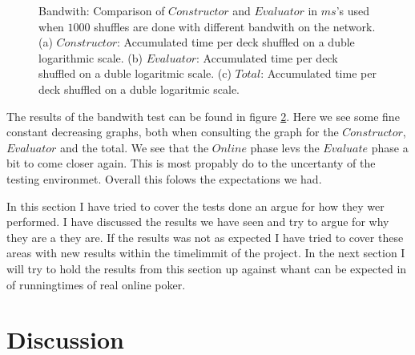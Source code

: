 \documentclass[twoside,11pt,openright]{report}
\begin{document}
\begin{figure}
    \begin{subfigure}{\textwidth}
        \centering
        \caption{}
        \label{fig:total_bandwith_plot}
    \end{subfigure}
    \caption{Bandwith: Comparison of $Constructor$ and $Evaluator$ in $ms$'s used when $1000$ shuffles are done with different bandwith on the network. (a) $Constructor$: Accumulated time per deck shuffled on a duble logarithmic scale. (b) $Evaluator$: Accumulated time per deck shuffled on a duble logaritmic scale. (c) $Total$: Accumulated time per deck shuffled on a duble logaritmic scale.}
    \label{fig:mesurement_bandwith}
\end{figure}

The results of the bandwith test can be found in figure \ref{fig:mesurement_bandwith}. Here we see some fine constant decreasing graphs, both when consulting the graph for the $Constructor$, $Evaluator$ and the total. We see that the $Online$ phase levs the $Evaluate$ phase a bit to come closer again. This is most propably do to the uncertanty of the testing environmet. Overall this folows the expectations we had.

\bigskip

In this section I have tried to cover the tests done an argue for how they wer performed. I have discussed the results we have seen and try to argue for why they are a they are. If the results was not as expected I have tried to cover these areas with new results within the timelimmit of the project. In the next section I will try to hold the results from this section up against whant can be expected in of runningtimes of real online poker.

\section{Discussion}
\label{sec:discussion}
\end{document}
